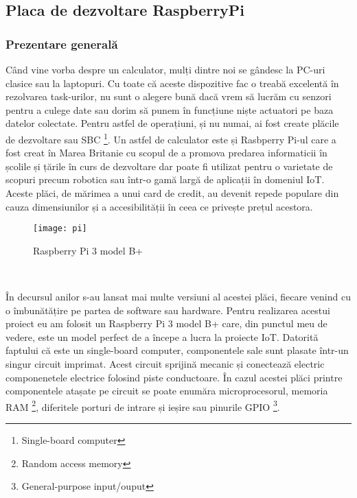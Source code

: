 \documentclass[../IoMusT.tex]{subfiles}
\begin{document}
\subsection{Placa de dezvoltare RaspberryPi}
\subsubsection{Prezentare generală}
Când vine vorba despre un calculator, mulți dintre noi se gândesc la PC-uri clasice sau la laptopuri. Cu toate că aceste dispozitive fac o treabă excelentă în rezolvarea task-urilor, nu sunt o alegere bună dacă vrem să lucrăm cu senzori pentru a culege date sau dorim să punem în funcțiune niște actuatori pe baza datelor colectate. Pentru astfel de operațiuni, și nu numai, ai fost create plăcile de dezvoltare sau SBC \footnote{Single-board computer}. Un astfel de calculator este și Rasbperry Pi-ul care a fost creat în Marea Britanie cu scopul de a promova predarea informaticii în școlile și țările în curs de dezvoltare \cite{SBC} dar poate fi utilizat pentru o varietate de scopuri precum robotica sau într-o gamă largă de aplicații în domeniul IoT. Aceste plăci, de mărimea a unui card de credit, au devenit repede populare din cauza dimensiunilor și a accesibilității în ceea ce privește prețul acestora. 
\begin{figure}[h]
\centering
\texttt{[image: pi]}
\caption{Raspberry Pi 3 model B+}
\end{figure}
\\
\par În decursul anilor s-au lansat mai multe versiuni al acestei plăci, fiecare venind cu o îmbunătățire pe partea de software sau hardware. Pentru realizarea acestui proiect eu am folosit un Raspberry Pi 3 model B+ care, din punctul meu de vedere, este un model perfect de a începe a lucra la proiecte IoT. Datorită faptului că este un single-board computer, componentele sale sunt plasate într-un singur circuit imprimat. Acest circuit sprijină mecanic și conectează electric componenetele electrice folosind piste conductoare. În cazul acestei plăci printre componentele atașate pe circuit se poate enumăra microprocesorul, memoria RAM \footnote{Random access memory}, diferitele porturi de intrare și ieșire sau pinurile GPIO \footnote{General-purpose input/ouput}.
\\
\par
\end{document}
